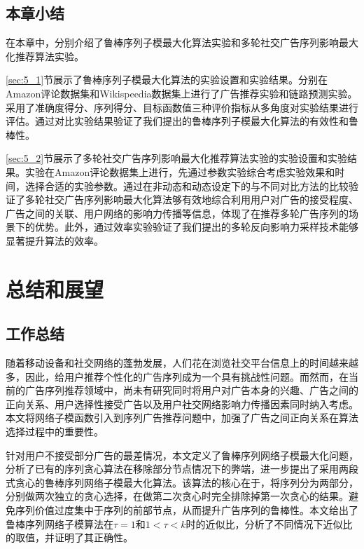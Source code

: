 \section{本章小结}

在本章中，分别介绍了鲁棒序列子模最大化算法实验和多轮社交广告序列影响最大化推荐算法实验。

\ref{sec:5_1}节展示了鲁棒序列子模最大化算法的实验设置和实验结果。分别在Amazon评论数据集和Wikispeedia数据集上进行了广告推荐实验和链路预测实验。采用了准确度得分、序列得分、目标函数值三种评价指标从多角度对实验结果进行评估。通过对比实验结果验证了我们提出的鲁棒序列子模最大化算法的有效性和鲁棒性。

\ref{sec:5_2}节展示了多轮社交广告序列影响最大化推荐算法实验的实验设置和实验结果。实验在Amazon评论数据集上进行，先通过参数实验综合考虑实验效果和时间，选择合适的实验参数。通过在非动态和动态设定下的与不同对比方法的比较验证了多轮社交广告序列影响最大化算法够有效地综合利用用户对广告的接受程度、广告之间的关联、用户网络的影响力传播等信息，体现了在推荐多轮广告序列的场景下的优势。此外，通过效率实验验证了我们提出的多轮反向影响力采样技术能够显著提升算法的效率。

\chapter{总结和展望}

\section{工作总结}

随着移动设备和社交网络的蓬勃发展，人们花在浏览社交平台信息上的时间越来越多，因此，给用户推荐个性化的广告序列成为一个具有挑战性问题。而然而，在当前的广告序列推荐领域中，尚未有研究同时将用户对广告本身的兴趣、广告之间的正向关系、用户选择性接受广告以及用户社交网络影响力传播因素同时纳入考虑。本文将网络子模函数引入到序列广告推荐问题中，加强了广告之间正向关系在算法选择过程中的重要性。

针对用户不接受部分广告的最差情况，本文定义了鲁棒序列网络子模最大化问题，分析了已有的序列贪心算法在移除部分节点情况下的弊端，进一步提出了采用两段式贪心的鲁棒序列网络子模最大化算法。该算法的核心在于，将序列分为两部分，分别做两次独立的贪心选择，在做第二次贪心时完全排除掉第一次贪心的结果。避免序列价值过度集中于序列的前部节点，从而提升广告序列的鲁棒性。本文给出了鲁棒序列网络子模算法在$\tau = 1$和$1 < \tau < k$时的近似比，分析了不同情况下近似比的取值，并证明了其正确性。

